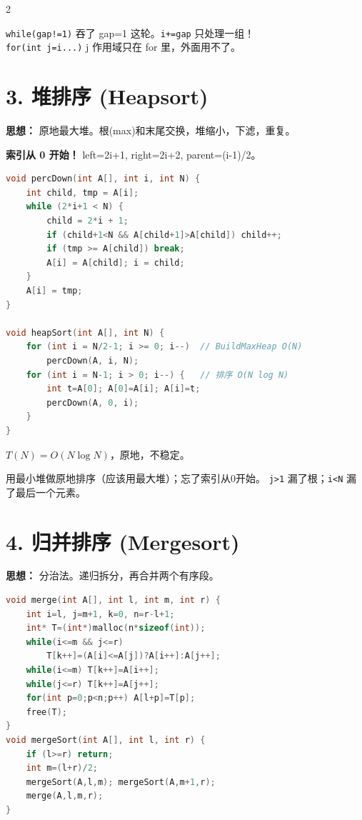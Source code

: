 \documentclass[10pt,a4paper]{article}
\begin{document}
\begin{multicols}{2}
\begin{bugbox}
\texttt{while(gap!=1)} 吞了 gap=1 这轮。\texttt{i+=gap} 只处理一组！\\
\texttt{for(int j=i...)} j 作用域只在 for 里，外面用不了。
\end{bugbox}

\section*{3. 堆排序 (Heapsort)}

\textbf{思想：} 原地最大堆。根(max)和末尾交换，堆缩小，下滤，重复。

\textbf{索引从 0 开始！} left=2i+1, right=2i+2, parent=(i-1)/2。

\begin{lstlisting}[language=C]
void percDown(int A[], int i, int N) {
    int child, tmp = A[i];
    while (2*i+1 < N) {
        child = 2*i + 1;
        if (child+1<N && A[child+1]>A[child]) child++;
        if (tmp >= A[child]) break;
        A[i] = A[child]; i = child;
    }
    A[i] = tmp;
}

void heapSort(int A[], int N) {
    for (int i = N/2-1; i >= 0; i--)  // BuildMaxHeap O(N)
        percDown(A, i, N);
    for (int i = N-1; i > 0; i--) {   // 排序 O(N log N)
        int t=A[0]; A[0]=A[i]; A[i]=t;
        percDown(A, 0, i);
    }
}
\end{lstlisting}

$T(N)=O(N\log N)$，原地，不稳定。

\begin{bugbox}
用最小堆做原地排序（应该用最大堆）；忘了索引从0开始。
\texttt{j>1} 漏了根；\texttt{i<N} 漏了最后一个元素。
\end{bugbox}

\section*{4. 归并排序 (Mergesort)}

\textbf{思想：} 分治法。递归拆分，再合并两个有序段。

\begin{lstlisting}[language=C]
void merge(int A[], int l, int m, int r) {
    int i=l, j=m+1, k=0, n=r-l+1;
    int* T=(int*)malloc(n*sizeof(int));
    while(i<=m && j<=r)
        T[k++]=(A[i]<=A[j])?A[i++]:A[j++];
    while(i<=m) T[k++]=A[i++];
    while(j<=r) T[k++]=A[j++];
    for(int p=0;p<n;p++) A[l+p]=T[p];
    free(T);
}
void mergeSort(int A[], int l, int r) {
    if (l>=r) return;
    int m=(l+r)/2;
    mergeSort(A,l,m); mergeSort(A,m+1,r);
    merge(A,l,m,r);
}
\end{lstlisting}


\end{multicols}
\end{document}
